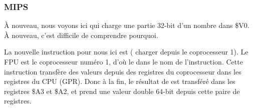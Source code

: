 \subsubsection{MIPS}



À nouveau, nous voyons ici  qui charge une partie 32-bit d'un nombre \Tdouble
dans \$V0.
À nouveau, c'est difficile de comprendre pourquoi.


La nouvelle instruction pour nous ici est  (
charger depuis le coprocesseur 1).
Le FPU est le coprocesseur numéro 1, d'où le  dans le nom de l'instruction.
Cette instruction transfère des valeurs depuis des registres du coprocesseur dans
les registres du CPU (\ac{GPR}).
Donc à la fin, le résultat de  est transféré dans les registres \$A3 et
\$A2, et \printf prend une valeur double 64-bit depuis cette paire de registres.

